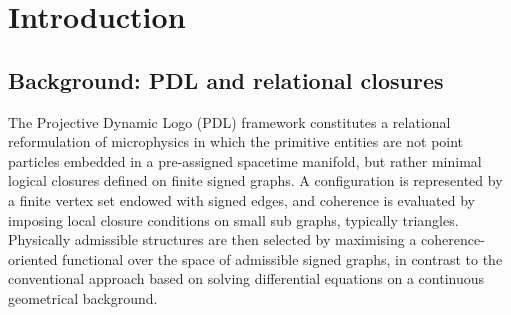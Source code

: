 \documentclass{article}
\theoremstyle{definition}
\begin{document}
\begin{abstract}
Interpreting $N$ as a logical wavelength and defining a logical frequency $\nu \propto 1/N$, this linear dependence implies that imposing an upper bound on the period is equivalent to imposing an upper bound on the sum $n_x + n_y + n_z$. Consequently, the number of admissible index triples scales with the volume of a three-dimensional discrete simplex.\cite{Density_of_states_Notes,Counting_States_2021} This combinatorial mode counting in the PDL cavity yields an effective density of states $\rho(\nu) \propto \nu^2$ in three dimensions, in direct correspondence with the standard continuum result for electromagnetic or quantum cavities.\cite{Density_of_states_Notes,EM_Cavities_Notes,Counting_States_2021}

We do not claim to derive full quantum field dynamics from PDL. Nonetheless, the present construction demonstrates that a purely relational, discrete, and local framework can sustain cavity-like modes with organised spectra and three-dimensional density-of-states scaling, thereby reinforcing the case for PDL as a viable substrate for emergent quantum behaviour.\cite{PDL_Main_2026,PDL_Position_2026}
\end{abstract}

\section{Introduction}

\subsection{Background: PDL and relational closures}

The Projective Dynamic Logo (PDL) framework constitutes a relational reformulation of microphysics in which the primitive entities are not point particles embedded in a pre-assigned spacetime manifold, but rather minimal logical closures defined on finite signed graphs.\cite{PDL_Intro_2026,PDL_Main_2026} A configuration is represented by a finite vertex set endowed with signed edges, and coherence is evaluated by imposing local closure conditions on small sub graphs, typically triangles. Physically admissible structures are then selected by maximising a coherence-oriented functional over the space of admissible signed graphs, in contrast to the conventional approach based on solving differential equations on a continuous geometrical background.\cite{PDL_Main_2026,PDL_Position_2026}
\end{document}

